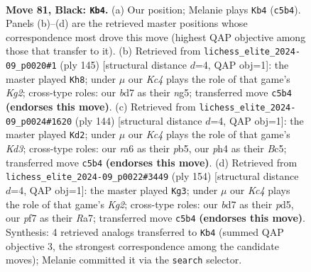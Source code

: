 \documentclass[11pt]{article}
\begin{document}
\clearpage

\begin{figure}[p]\centering
\begin{subfigure}{0.46\textwidth}\centering
\resizebox{\linewidth}{!}{%
\newchessgame
\chessboard[
  setfen={8/3B1P2/R7/2k5/7P/8/8/6K1 b - - 6 81},
  showmover=false,
  pgfstyle=straightmove, color=movearrow, markmove={c5-b4}
]}
\caption{}
\end{subfigure}\hfill
\begin{subfigure}{0.46\textwidth}\centering
\resizebox{\linewidth}{!}{%
\newchessgame
\chessboard[
  setfen={8/3K2k1/8/6N1/P7/8/8/5R2 b - - 9 73},
  showmover=false,
  pgfstyle=straightmove, color=movearrow, markmove={g7-h8}
]}
\caption{}
\end{subfigure}
\\[4pt]
\begin{subfigure}{0.46\textwidth}\centering
\resizebox{\linewidth}{!}{%
\newchessgame
\chessboard[
  setfen={8/8/8/1pB5/5k2/3K4/6p1/3b4 w - - 0 73},
  showmover=false,
  pgfstyle=straightmove, color=movearrow, markmove={d3-d2}
]}
\caption{}
\end{subfigure}\hfill
\begin{subfigure}{0.46\textwidth}\centering
\resizebox{\linewidth}{!}{%
\newchessgame
\chessboard[
  setfen={8/R7/8/3p4/8/3k4/6K1/2r5 w - - 41 78},
  showmover=false,
  pgfstyle=straightmove, color=movearrow, markmove={g2-g3}
]}
\caption{}
\end{subfigure}
\caption{\textbf{Move 81, Black: \texttt{Kb4}.} (a) Our position; Melanie plays \texttt{Kb4} (\texttt{c5b4}). Panels (b)--(d) are the retrieved master positions whose correspondence most drove this move (highest QAP objective among those that transfer to it). (b) Retrieved from \texttt{lichess\_elite\_2024-09\_p0020\#1} (ply 145) [structural distance $d$=4, QAP obj=1]: the master played \texttt{Kh8}; under $\mu$ our \emph{Kc4} plays the role of that game's \emph{Kg2}; cross-type roles: our \emph{b}d7 as their \emph{n}g5; transferred move \texttt{c5b4} \textbf{(endorses this move)}. (c) Retrieved from \texttt{lichess\_elite\_2024-09\_p0024\#1620} (ply 144) [structural distance $d$=4, QAP obj=1]: the master played \texttt{Kd2}; under $\mu$ our \emph{Kc4} plays the role of that game's \emph{Kd3}; cross-type roles: our \emph{r}a6 as their \emph{p}b5, our \emph{p}h4 as their \emph{B}c5; transferred move \texttt{c5b4} \textbf{(endorses this move)}. (d) Retrieved from \texttt{lichess\_elite\_2024-09\_p0022\#3449} (ply 154) [structural distance $d$=4, QAP obj=1]: the master played \texttt{Kg3}; under $\mu$ our \emph{Kc4} plays the role of that game's \emph{Kg2}; cross-type roles: our \emph{b}d7 as their \emph{p}d5, our \emph{p}f7 as their \emph{R}a7; transferred move \texttt{c5b4} \textbf{(endorses this move)}. Synthesis: 4 retrieved analogs transferred to \texttt{Kb4} (summed QAP objective 3, the strongest correspondence among the candidate moves); Melanie committed it via the \texttt{search} selector.}
\label{fig:thought-m161}
\end{figure}
\end{document}
